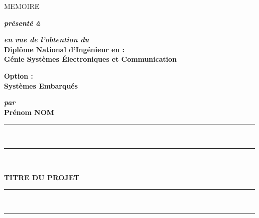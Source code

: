 \begin{titlepage}
\begin{center}

\vspace{10pt} {%
  \renewcommand*{\familydefault}{\defaultFont}
  \fontsize{36pt}{36pt}\selectfont%
  MEMOIRE\\%
}

\vspace{30pt}%
\textbf{\textit{présenté à}}\\



\vspace{20pt}
\textbf{\textit{en vue de l'obtention du}}\\

\vspace{10pt}
\renewcommand*{\familydefault}{\defaultFont}
\fontsize{14pt}{14pt}\selectfont%
\textbf{%
Diplôme National d'Ingénieur en :\\
Génie Systèmes Électroniques et Communication\\
}

\vspace{20pt}
\renewcommand*{\familydefault}{\defaultFont}
\fontsize{14pt}{14pt}\selectfont%
\textbf{%
Option :\\
Systèmes Embarqués\\
}

\vspace{30pt}
\textbf{\textit{par}}\\
\vspace{10pt} {%
  \fontsize{18pt}{18pt}\selectfont%
  \textbf{Prénom NOM}\\
}%

\vspace{20pt} {%
  \begin{spacing}{0.05}
    \rule{200pt}{2pt}\\
    \rule{200pt}{0.75pt}\\
  \end{spacing}
  \renewcommand*{\familydefault}{\defaultFont}
  \fontsize{17pt}{17pt}\selectfont%
  \vspace{20pt}
  \textbf{
  TITRE DU PROJET\\%
  }
  \vspace{10pt}
  \begin{spacing}{0.05}
    \rule{200pt}{0.75pt}\\
    \rule{200pt}{2pt}\\
  \end{spacing}
}


\end{center}
\end{titlepage}

